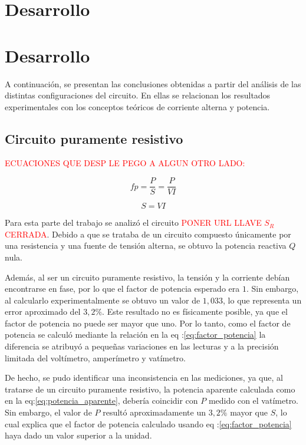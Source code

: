 \section{Desarrollo}
\section{Desarrollo}

A continuación, se presentan las conclusiones obtenidas a partir del análisis de las distintas configuraciones del circuito. En ellas se relacionan los resultados experimentales con los conceptos teóricos de corriente alterna y potencia.

\subsection{Circuito puramente resistivo}
\textcolor{red}{\MakeUppercase{Ecuaciones que desp le pego a algun otro lado: }}

\begin{equation}
fp = \frac{P}{S} = \frac{P}{VI}
\label{eq:factor_potencia}
\end{equation}

\begin{equation}
S = VI
\label{eq:potencia_aparente}
\end{equation}


Para esta parte del trabajo se analizó el circuito \textcolor{red}{\MakeUppercase{Poner URL llave $S_R$ cerrada}}. Debido a que se trataba de un circuito compuesto únicamente por una resistencia y una fuente de tensión alterna, se obtuvo la potencia reactiva \(Q\) nula.

Además, al ser un circuito puramente resistivo, la tensión y la corriente debían encontrarse en fase, por lo que el factor de potencia esperado era \(1\). Sin embargo, al calcularlo experimentalmente se obtuvo un valor de \(1{,}033\), lo que representa un error aproximado del \(3{,}2\%\). Este resultado no es físicamente posible, ya que el factor de potencia no puede ser mayor que uno. Por lo tanto, como el factor de potencia se calculó mediante la relación en la eq
:\eqref{eq:factor_potencia} la diferencia se atribuyó a pequeñas variaciones en las lecturas y a la precisión limitada del voltímetro, amperímetro y vatímetro.

De hecho, se pudo identificar una inconsistencia en las mediciones, ya que, al tratarse de un circuito puramente resistivo, la potencia aparente calculada como en la eq:\eqref{eq:potencia_aparente}, debería coincidir con \(P\) medido con el vatímetro. Sin embargo, el valor de \(P\) resultó aproximadamente un \(3{,}2\%\) mayor que \(S\), lo cual explica que el factor de potencia calculado usando eq
:\eqref{eq:factor_potencia} haya dado un valor superior a la unidad.

